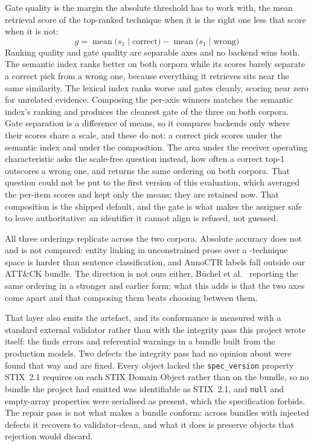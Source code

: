 Gate quality is the margin the absolute threshold has to work with, the mean retrieval score of
the top-ranked technique when it is the right one less that score when it is not:
\begin{equation}\label{eq:gate}
g = \operatorname{mean}\bigl(s_1 \mid \text{correct}\bigr)
  - \operatorname{mean}\bigl(s_1 \mid \text{wrong}\bigr)
\end{equation}
Ranking quality and gate quality are separable axes and no backend wins both. The semantic index
ranks better on both corpora while its scores barely separate a correct pick from a wrong one,
because everything it retrieves sits near the same similarity. The lexical index ranks worse and
gates cleanly, scoring near zero for unrelated evidence. Composing the per-axis winners matches the
semantic index's ranking and produces the cleanest gate of the three on both corpora. Gate
separation is a difference of means, so it compares backends only where their scores share a scale,
and these do not: a correct pick scores  under the semantic
index and  under the composition. The area under the receiver
operating characteristic asks the scale-free question instead, how often a correct top-1 outscores a
wrong one, and returns the same ordering on both corpora. That question could not be put to the
first version of this evaluation, which averaged the per-item scores and kept only the means; they
are retained now. That composition is the
shipped default, and the gate is what makes the assigner safe to leave authoritative: an identifier
it cannot align is refused, not guessed.

All three orderings replicate across the two corpora. Absolute accuracy does not and is not
compared: entity linking in unconstrained prose over a -technique space
is harder than sentence classification, and  AnnoCTR labels fall
outside our ATT\&CK bundle. The direction is not ours either, B\"uchel et al.~\cite{buchel2025sok} reporting the
same ordering in a stronger and earlier form; what this adds is that the two axes come apart and
that composing them beats choosing between them.

That layer also emits the artefact, and its conformance is measured with a standard external
validator rather than with the integrity pass this project wrote itself: the 
finds  errors and  referential warnings in
a bundle built from the production models. Two defects the integrity pass had no opinion about were
found that way and are fixed. Every object lacked the \texttt{spec\_version} property STIX~2.1
requires on each STIX Domain Object rather than on the bundle, so no bundle the project had emitted
was identifiable as STIX~2.1, and \texttt{null} and empty-array properties were serialised as
present, which the specification forbids. The repair pass is not what makes a bundle conform: across
 bundles with injected defects it recovers
 to validator-clean, and what it does is preserve
 objects that rejection would discard.

